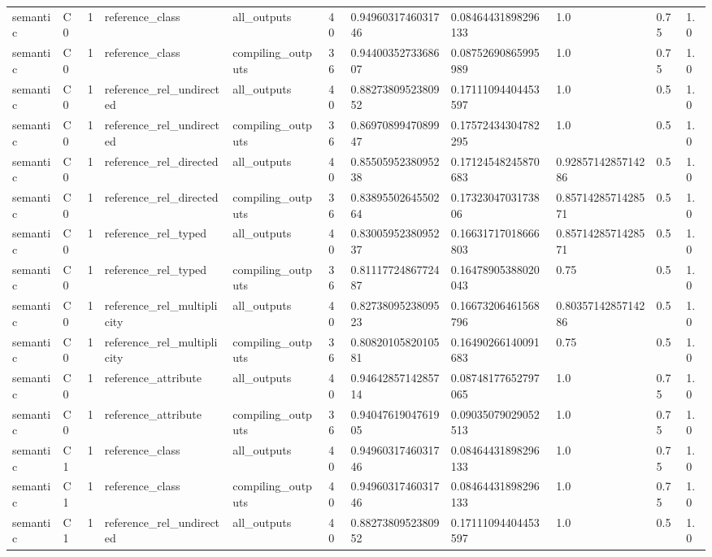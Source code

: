 \begin{tabular}{lllllllllll}
semantic & C0 & 1 & reference\_class & all\_outputs & 40 & 0.9496031746031746 & 0.08464431898296133 & 1.0 & 0.75 & 1.0 \\
semantic & C0 & 1 & reference\_class & compiling\_outputs & 36 & 0.9440035273368607 & 0.08752690865995989 & 1.0 & 0.75 & 1.0 \\
semantic & C0 & 1 & reference\_rel\_undirected & all\_outputs & 40 & 0.8827380952380952 & 0.17111094404453597 & 1.0 & 0.5 & 1.0 \\
semantic & C0 & 1 & reference\_rel\_undirected & compiling\_outputs & 36 & 0.8697089947089947 & 0.17572434304782295 & 1.0 & 0.5 & 1.0 \\
semantic & C0 & 1 & reference\_rel\_directed & all\_outputs & 40 & 0.8550595238095238 & 0.17124548245870683 & 0.9285714285714286 & 0.5 & 1.0 \\
semantic & C0 & 1 & reference\_rel\_directed & compiling\_outputs & 36 & 0.8389550264550264 & 0.1732304703173806 & 0.8571428571428571 & 0.5 & 1.0 \\
semantic & C0 & 1 & reference\_rel\_typed & all\_outputs & 40 & 0.8300595238095237 & 0.16631717018666803 & 0.8571428571428571 & 0.5 & 1.0 \\
semantic & C0 & 1 & reference\_rel\_typed & compiling\_outputs & 36 & 0.8111772486772487 & 0.16478905388020043 & 0.75 & 0.5 & 1.0 \\
semantic & C0 & 1 & reference\_rel\_multiplicity & all\_outputs & 40 & 0.8273809523809523 & 0.16673206461568796 & 0.8035714285714286 & 0.5 & 1.0 \\
semantic & C0 & 1 & reference\_rel\_multiplicity & compiling\_outputs & 36 & 0.8082010582010581 & 0.16490266140091683 & 0.75 & 0.5 & 1.0 \\
semantic & C0 & 1 & reference\_attribute & all\_outputs & 40 & 0.9464285714285714 & 0.08748177652797065 & 1.0 & 0.75 & 1.0 \\
semantic & C0 & 1 & reference\_attribute & compiling\_outputs & 36 & 0.9404761904761905 & 0.09035079029052513 & 1.0 & 0.75 & 1.0 \\
semantic & C1 & 1 & reference\_class & all\_outputs & 40 & 0.9496031746031746 & 0.08464431898296133 & 1.0 & 0.75 & 1.0 \\
semantic & C1 & 1 & reference\_class & compiling\_outputs & 40 & 0.9496031746031746 & 0.08464431898296133 & 1.0 & 0.75 & 1.0 \\
semantic & C1 & 1 & reference\_rel\_undirected & all\_outputs & 40 & 0.8827380952380952 & 0.17111094404453597 & 1.0 & 0.5 & 1.0 \\

\end{tabular}
